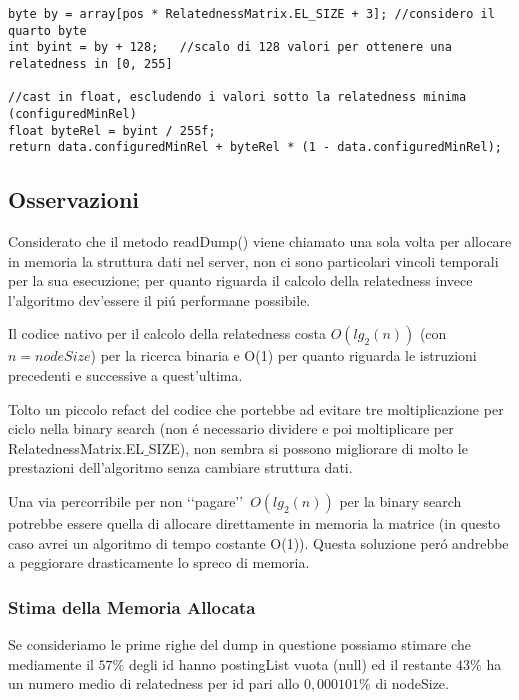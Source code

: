 \begin{lstlisting}[style=JavaStyle]
byte by = array[pos * RelatednessMatrix.EL_SIZE + 3]; //considero il quarto byte 
int byint = by + 128;   //scalo di 128 valori per ottenere una relatedness in [0, 255]

//cast in float, escludendo i valori sotto la relatedness minima (configuredMinRel)
float byteRel = byint / 255f; 
return data.configuredMinRel + byteRel * (1 - data.configuredMinRel);
\end{lstlisting}

\subsection{Osservazioni}
Considerato che il metodo readDump() viene chiamato una sola volta per allocare in memoria la struttura dati nel server, 
non ci sono particolari vincoli temporali per la sua esecuzione; per quanto riguarda il calcolo della relatedness invece 
l'algoritmo dev'essere il pi\'u performane possibile.

Il codice nativo per il calcolo della relatedness costa $O(lg_2(n))$ (con $n=nodeSize$) per la ricerca binaria e O(1) per quanto riguarda le 
istruzioni precedenti e successive a quest'ultima.

Tolto un piccolo refact del codice che portebbe ad evitare tre moltiplicazione per ciclo nella binary search (non \'e necessario dividere e poi moltiplicare per 
RelatednessMatrix.EL$\_$SIZE), non sembra si possono migliorare di molto le prestazioni dell'algoritmo senza cambiare struttura dati.

Una via percorribile per non \lq\lq pagare\rq\rq\ $O(lg_2(n))$ per la binary search potrebbe essere quella di allocare direttamente in memoria la matrice (in questo caso
avrei un algoritmo di tempo costante O(1)). Questa soluzione per\'o andrebbe a peggiorare drasticamente lo spreco di memoria.

\subsubsection{Stima della Memoria Allocata}
Se consideriamo le prime righe del dump in questione possiamo stimare che mediamente il $57\%$ degli id hanno postingList vuota (null) ed il restante $43\%$ ha un numero 
medio di relatedness per id pari allo $0,000101\%$ di nodeSize.

